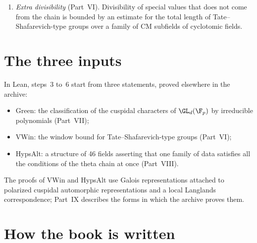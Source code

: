 \begin{enumerate}
\item \emph{Extra divisibility} (Part~VI). Divisibility of special values that does not come from the chain is bounded by an estimate for the total length of Tate--Shafarevich-type groups over a family of CM subfields of cyclotomic fields.
\end{enumerate}

\section*{The three inputs}

In Lean, steps~3 to~6 start from three statements, proved elsewhere in the archive:
\begin{itemize}
\item \textsf{Green}: the classification of the cuspidal characters of $\GL_d(\F_p)$ by irreducible polynomials (Part~VII);
\item \textsf{VWin}: the window bound for Tate--Shafarevich-type groups (Part~VI);
\item \textsf{HypsAlt}: a structure of 46 fields asserting that one family of data satisfies all the conditions of the theta chain at once (Part~VIII).
\end{itemize}
The proofs of \textsf{VWin} and \textsf{HypsAlt} use Galois representations attached to polarized cuspidal automorphic representations and a local Langlands correspondence; Part~IX describes the forms in which the archive proves them.

\section*{How the book is written}


